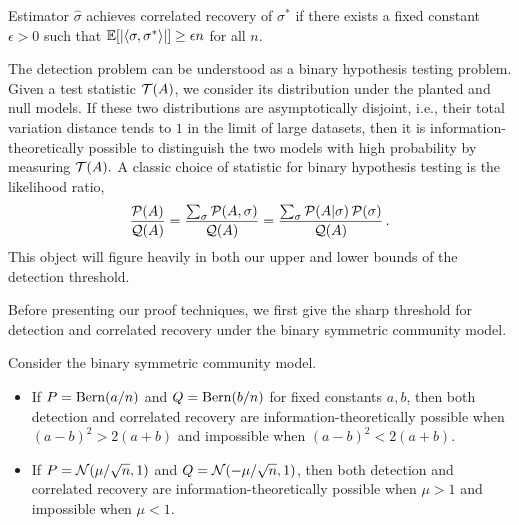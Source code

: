 \begin{definition}
Estimator $\hat{\sigma}$ achieves correlated recovery of $\sigma^*$ if there exists a fixed
constant $\epsilon>0$ such that  $\mathbb{E}[ \left| \left \langle \sigma, \sigma^* \right\rangle \right| ] \ge \epsilon n$ for all $n$.
\end{definition}



The detection problem can be understood as a binary hypothesis testing problem.  Given a test statistic ${\mathcal{T}}(A)$, we consider its distribution under the planted and null models.  
If these two distributions are asymptotically disjoint, i.e., their total variation distance tends to $1$ in the limit of large datasets, then it is information-theoretically possible to distinguish the two models with high probability by measuring ${\mathcal{T}}(A).$ A classic choice of statistic for binary hypothesis testing
is the likelihood ratio, 
%
\[
	\frac{\mathcal{P}(A)}{\mathcal{Q}(A)} 
	= \frac{\sum_\sigma \mathcal{P}(A, \sigma)}{\mathcal{Q}(A)} 
	= \frac{\sum_\sigma \mathcal{P}(A | \sigma) \,\mathcal{P}(\sigma)}{\mathcal{Q}(A)} \, . 
\]
This object will figure heavily in both our upper and lower bounds of the detection threshold. 



Before presenting our proof techniques, we first give the sharp threshold for 
detection and correlated recovery under the binary symmetric community model.

\begin{theorem}
\label{thm:corr}
Consider the binary symmetric community model. 
\begin{itemize}
\item If  $P={\rm Bern}(a/n)$ and $Q={\rm Bern}(b/n)$ for 
fixed constants $a, b$, then both detection and correlated recovery are information-theoretically 
possible  when $(a-b)^2>2(a+b)$ and impossible when $(a-b)^2<2(a+b)$.
\item If $P={\mathcal{N}}(\mu/\sqrt{n},1)$ and $Q={\mathcal{N}}(- \mu/\sqrt{n},1)$, then both detection and correlated recovery are information-theoretically possible when $\mu>1$
and impossible when $\mu<1$. 
\end{itemize}
\end{theorem}

